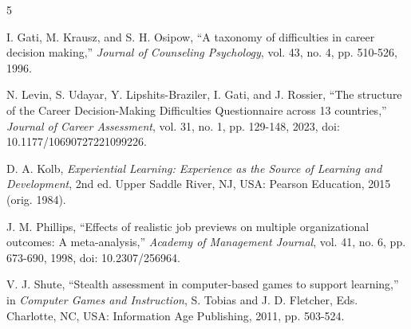 \newpage
\begingroup\sloppy
\begin{thebibliography}{5}
 I. Gati, M. Krausz, and S. H. Osipow, ``A taxonomy of difficulties in career decision making,'' \textit{Journal of Counseling Psychology}, vol. 43, no. 4, pp. 510-526, 1996.

 N. Levin, S. Udayar, Y. Lipshits-Braziler, I. Gati, and J. Rossier, ``The structure of the Career Decision-Making Difficulties Questionnaire across 13 countries,'' \textit{Journal of Career Assessment}, vol. 31, no. 1, pp. 129-148, 2023, doi: 10.1177/10690727221099226.

 D. A. Kolb, \textit{Experiential Learning: Experience as the Source of Learning and Development}, 2nd ed. Upper Saddle River, NJ, USA: Pearson Education, 2015 (orig. 1984).

 J. M. Phillips, ``Effects of realistic job previews on multiple organizational outcomes: A meta-analysis,'' \textit{Academy of Management Journal}, vol. 41, no. 6, pp. 673-690, 1998, doi: 10.2307/256964.

 V. J. Shute, ``Stealth assessment in computer-based games to support learning,'' in \textit{Computer Games and Instruction}, S. Tobias and J. D. Fletcher, Eds. Charlotte, NC, USA: Information Age Publishing, 2011, pp. 503-524.
\end{thebibliography}
\endgroup
